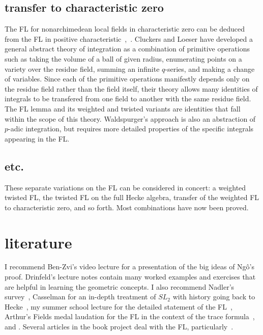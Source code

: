 \documentclass[brochure,english,12pt]{bourbaki}
\theoremstyle{plain}
\begin{document}
\subsection{transfer to characteristic zero}

The FL for nonarchimedean local fields in characteristic zero can be
deduced from the FL in positive
characteristic~\cite{Wald:2006},~\cite{CHL:2010}.  Cluckers and Loeser
have developed a general abstract theory of integration as a
combination of primitive operations such as taking the volume of a
ball of given radius, enumerating points on a variety over the residue
field, summing an infinite $q$-series, and making a change of
variables.  Since each of the primitive operations manifestly depends
only on the residue field rather than the field itself, their theory
allows many identities of integrals to be transfered from one field to
another with the same residue field.  The FL lemma and its weighted
and twisted variants are identities that fall within the scope of this
theory.  Waldspurger's approach is also an abstraction
of $p$-adic integration, but requires more detailed
properties of the specific integrals appearing in the FL.

\subsection{etc.}

These separate variations on the FL can be considered in concert: a
weighted twisted FL, the twisted FL on the full Hecke algebra,
transfer of the weighted FL to characteristic zero, and so forth.
Most combinations have now been proved.

\section{literature}

I recommend Ben-Zvi's video lecture for a presentation of the big
ideas of Ng\^o's proof.  Drinfeld's lecture notes contain many worked
examples and exercises that are helpful in learning the 
geometric concepts.  I also recommend Nadler's survey~\cite{Nadler:2010},
Casselman for an in-depth treatment of $SL_2$ with history going back
to Hecke~\cite{Cass:2010}, my summer school lecture for the detailed
statement of the FL~\cite{Hales:FL-statement}, Arthur's Fields medal laudation for
the FL in the context of the trace formula~\cite{Arthur:2010}, and
\cite{CHLaumon:2010}.  Several articles in the book project
\cite{Harris:book-project} deal with the FL,
particularly~\cite{DN:2010}.
\end{document}

